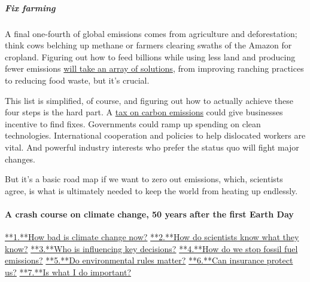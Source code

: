 \hypertarget{fix-farming}{%
\subparagraph{\texorpdfstring{\textbf{Fix
farming}}{Fix farming}}\label{fix-farming}}

A final one-fourth of global emissions comes from agriculture and
deforestation; think cows belching up methane or farmers clearing swaths
of the Amazon for cropland. Figuring out how to feed billions while
using less land and producing fewer emissions
\href{https://www.nytimes3xbfgragh.onion/2018/12/05/climate/agriculture-food-global-warming.html}{will
take an array of solutions}, from improving ranching practices to
reducing food waste, but it's crucial.

This list is simplified, of course, and figuring out how to actually
achieve these four steps is the hard part. A
\href{https://www.nytimes3xbfgragh.onion/2014/05/30/science/a-price-tag-on-carbon-as-a-climate-rescue-plan.html}{tax
on carbon emissions} could give businesses incentive to find fixes.
Governments could ramp up spending on clean technologies. International
cooperation and policies to help dislocated workers are vital. And
powerful industry interests who prefer the status quo will fight major
changes.

But it's a basic road map if we want to zero out emissions, which,
scientists agree, is what is ultimately needed to keep the world from
heating up endlessly.

\hypertarget{a-crash-course-on-climate-change-50-years-after-the-first-earth-day-4}{%
\paragraph{A crash course on climate change, 50 years after the first
Earth
Day}\label{a-crash-course-on-climate-change-50-years-after-the-first-earth-day-4}}

\href{/interactive/2020/04/19/climate/climate-crash-course-1.html}{**1.**How
bad is climate change now?}
\href{/interactive/2020/04/19/climate/climate-crash-course-2.html}{**2.**How
do scientists know what they know?}
\href{/interactive/2020/04/19/climate/climate-crash-course-3.html}{**3.**Who
is influencing key decisions?}
\href{/interactive/2020/04/19/climate/climate-crash-course-4.html}{**4.**How
do we stop fossil fuel emissions?}
\href{/interactive/2020/04/19/climate/climate-crash-course-5.html}{**5.**Do
environmental rules matter?}
\href{/interactive/2020/04/19/climate/climate-crash-course-6.html}{**6.**Can
insurance protect us?}
\href{/interactive/2020/04/19/climate/climate-crash-course-7.html}{**7.**Is
what I do important?}

